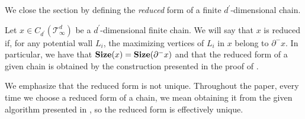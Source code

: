 We close the section by defining the \textit{reduced} form of a finite $d^{\prime}$-dimensional chain. 
\begin{definition}
  \label{def:reduced}
Let $x \in C_{d^{\prime}}(\mathcal T_\infty^d)$ be a $d^{\prime}$-dimensional finite chain. We will say that $x$ is reduced if, for any potential wall $L_{i}$, the maximizing vertices of $L_{i}$ in $x$ belong to $\partial^{-} x$.
  In particular, we have that $\mathbf{Size}(x) = \mathbf{Size}(\partial^{-} x)$ and that the reduced form of a given chain is obtained by the construction presented in the proof of . 
\end{definition}
We emphasize that the reduced form is not unique. Throughout the paper, every time we choose a reduced form of a chain, we mean obtaining it from the given algorithm presented in , so the reduced form is effectively unique.


 










